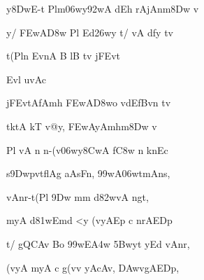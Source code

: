 {\dn y\38DwE-t Plm\306wy\392wA d\?Eh rAjAnm\38Dw v\4 \vegdn\dontdisplaylinenum}

{\dn y/ \3FEwA\3D8w\2 Pl\2 Ed\326wy\2 t/ vA d\?fy tv{\dandabdn} \dontdisplaylinenum}

{\dn t(Pl\?n EvnA B l\0B\2 tv jFEvt \vegdn\dontdisplaylinenum}

{\dn Evl uvAc{\dandabdn}\dontdisplaylinenum }

{\dn jFEvtAfAmh\2 \3FEwA\3D8wo v\4d\?EfBvn\2 tv{\dandadn} \dontdisplaylinenum}

{\dn {}tktA\0 kT\2 v@y, \3FEwAyAmhm\38Dw v\4 \vegdn\dontdisplaylinenum}

{\dn Pl\2 vA n n-(v\306wy\38CwA\2 f\3C8w\2 n k\?nEc \dontdisplaylinenum}

{\dn s\39Dwpv\0tf\4lAg\5\? aAsFn, \399wA\306wtmAns, \vegdn\dontdisplaylinenum}

{\dn vAnr-t(Pl\2 \39Dw mm d\382wvA ng\0t,{\dandabdn} \dontdisplaylinenum}

{\dn myA d\381wEmd\2 <y\2 (vyAEp c nrAEDp\? \vegdn\dontdisplaylinenum}

{\dn t/ gQCAv Bo \399w\?E\3A4w \35Bwyt\? yEd vAnr,{\dandabdn} \dontdisplaylinenum}

{\dn (vyA myA c g(v\4v yAcAv, \3DAwvgAEDp, \vegdn\dontdisplaylinenum}

